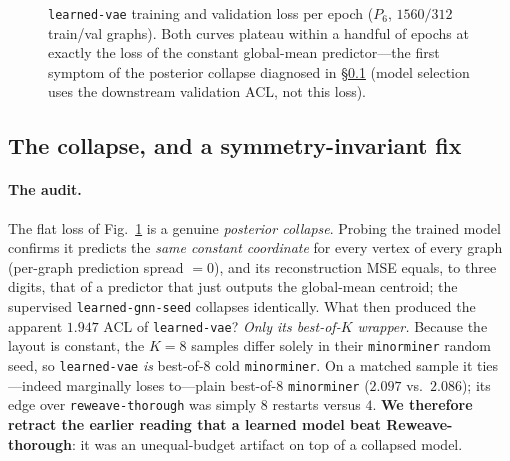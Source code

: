 \documentclass[acmsmall,anonymous,nonacm]{acmart}
\begin{document}
\begin{figure}[t]
\centering
{}
\caption{\texttt{learned-vae} training and validation loss per epoch ($P_6$, $1560/312$
train/val graphs). Both curves plateau within a handful of epochs at exactly the
loss of the constant global-mean predictor---the first symptom of the posterior
collapse diagnosed in \S\ref{sec:learn-collapse} (model
selection uses the downstream validation ACL, not this loss).}
\label{fig:vaeloss}
\end{figure}

\subsection{The collapse, and a symmetry-invariant fix}
\label{sec:learn-collapse}

\paragraph{The audit.} The flat loss of Fig.~\ref{fig:vaeloss} is a genuine
\emph{posterior collapse}. Probing the trained model confirms it predicts the
\emph{same constant coordinate} for every vertex of every graph (per-graph prediction
spread $=0$), and its reconstruction MSE equals, to three digits, that of a predictor
that just outputs the global-mean centroid; the supervised \texttt{learned-gnn-seed}
collapses identically. What then produced the apparent $1.947$ ACL of
\texttt{learned-vae}? \emph{Only its best-of-$K$ wrapper.} Because the layout is
constant, the $K{=}8$ samples differ solely in their \texttt{minorminer} random seed,
so \texttt{learned-vae} \emph{is} best-of-$8$ cold \texttt{minorminer}. On a matched
sample it ties---indeed marginally loses to---plain best-of-$8$ \texttt{minorminer}
($2.097$ vs.\ $2.086$); its edge over \texttt{reweave-thorough} was simply $8$
restarts versus $4$. \textbf{We therefore retract the earlier reading that a learned
model beat Reweave-thorough}: it was an unequal-budget artifact on top of a
collapsed model.
\end{document}
